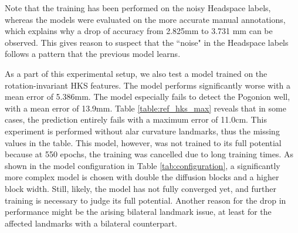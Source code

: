 \documentclass[class=article, crop=false]{standalone}
\begin{document}
Note that the training has been performed on the noisy Headspace labels, whereas the models were evaluated on the more accurate manual annotations, which explains why a drop of accuracy from 2.825mm to 3.731 mm can be observed. This gives reason to suspect that the ``noise" in the Headspace labels follows a pattern that the previous model learns.

As a part of this experimental setup, we also test a model trained on the rotation-invariant HKS features. The model performs significantly worse with a mean error of 5.386mm. The model especially fails to detect the Pogonion well, with a mean error of 13.9mm. Table \ref{table:ref_hks_max} reveals that in some cases, the prediction entirely fails with a maximum error of 11.0cm. This experiment is performed without alar curvature landmarks, thus the missing values in the table. This model, however, was not trained to its full potential because at 550 epochs, the training was cancelled due to long training times. As shown in the model configuration in Table \ref{tab:configuration}, a significantly more complex model is chosen with double the diffusion blocks and a higher block width. Still, likely, the model has not fully converged yet, and further training is necessary to judge its full potential. Another reason for the drop in performance might be the arising bilateral landmark issue, at least for the affected landmarks with a bilateral counterpart. 
\end{document}
